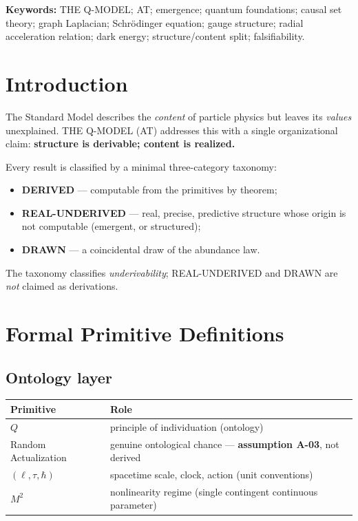 \documentclass[11pt,a4paper]{article}
\begin{document}
\noindent\textbf{Keywords:} THE Q-MODEL; AT; emergence; quantum foundations; causal set
theory; graph Laplacian; Schr\"odinger equation; gauge structure; radial acceleration
relation; dark energy; structure/content split; falsifiability.

\tableofcontents

\section{Introduction}
\label{sec:intro}

The Standard Model describes the \emph{content} of particle physics but leaves its
\emph{values} unexplained. THE Q-MODEL (AT) addresses this with a single organizational
claim: \textbf{structure is derivable; content is realized.}

Every result is classified by a minimal three-category taxonomy:
\begin{itemize}
\item \textbf{DERIVED} — computable from the primitives by theorem;
\item \textbf{REAL-UNDERIVED} — real, precise, predictive structure whose origin is not
      computable (emergent, or structured);
\item \textbf{DRAWN} — a coincidental draw of the abundance law.
\end{itemize}
The taxonomy classifies \emph{underivability}; REAL-UNDERIVED and DRAWN are \emph{not}
claimed as derivations.

\section{Formal Primitive Definitions}
\label{sec:primitives}

\subsection{Ontology layer}
\begin{center}
\begin{tabular}{ll}
\toprule
Primitive & Role \\
\midrule
$Q$ & principle of individuation (ontology) \\
Random Actualization & genuine ontological chance — \textbf{assumption A-03}, not derived \\
$(\ell,\tau,\hbar)$ & spacetime scale, clock, action (unit conventions) \\
$M^2$ & nonlinearity regime (single contingent continuous parameter) \\
\bottomrule
\end{tabular}
\end{center}
\end{document}
